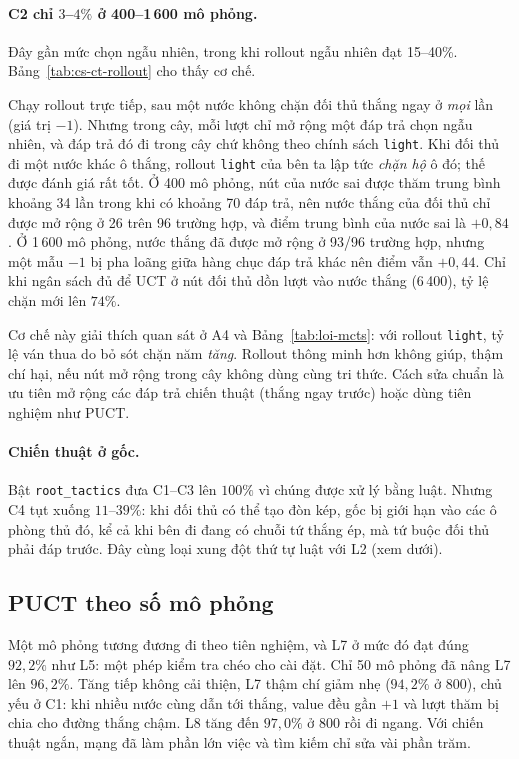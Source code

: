 \paragraph{C2 chỉ $3$--$4\%$ ở 400--1\,600 mô phỏng.} Đây gần mức chọn ngẫu nhiên, trong khi rollout ngẫu nhiên đạt
15--40\%. Bảng~\ref{tab:cs-ct-rollout} cho thấy cơ chế.

Chạy rollout trực tiếp, sau một nước không chặn đối thủ thắng ngay ở \emph{mọi} lần (giá trị $-1$). Nhưng trong cây,
mỗi lượt chỉ mở rộng một đáp trả chọn ngẫu nhiên, và đáp trả đó đi trong cây chứ không theo chính sách
\texttt{light}. Khi đối thủ đi một nước khác ô thắng, rollout \texttt{light} của bên ta lập tức \emph{chặn hộ} ô đó; thế
được đánh giá rất tốt. Ở 400 mô phỏng, nút của nước sai được thăm trung bình khoảng 34 lần trong khi có khoảng 70 đáp
trả, nên nước thắng của đối thủ chỉ được mở rộng ở 26 trên 96 trường hợp, và điểm trung bình của nước sai là $+0{,}84$.
Ở 1\,600 mô phỏng, nước thắng đã được mở rộng ở 93/96 trường hợp, nhưng một mẫu $-1$ bị pha loãng giữa hàng chục đáp
trả khác nên điểm vẫn $+0{,}44$. Chỉ khi ngân sách đủ để UCT ở nút đối thủ dồn lượt vào nước thắng (6\,400), tỷ lệ chặn
mới lên $74\%$.

Cơ chế này giải thích quan sát ở A4 và Bảng~\ref{tab:loi-mcts}: với rollout \texttt{light}, tỷ lệ ván thua do bỏ sót chặn
năm \emph{tăng}. Rollout thông minh hơn không giúp, thậm chí hại, nếu nút mở rộng trong cây không dùng cùng tri thức.
Cách sửa chuẩn là ưu tiên mở rộng các đáp trả chiến thuật (thắng ngay trước) hoặc dùng tiên nghiệm như PUCT.

\paragraph{Chiến thuật ở gốc.} Bật \texttt{root\_tactics} đưa C1--C3 lên $100\%$ vì chúng được xử lý bằng luật. Nhưng C4
tụt xuống $11$--$39\%$: khi đối thủ có thể tạo đòn kép, gốc bị giới hạn vào các ô phòng thủ đó, kể cả khi bên đi đang có
chuỗi tứ thắng ép, mà tứ buộc đối thủ phải đáp trước. Đây cùng loại xung đột thứ tự luật với L2 (xem dưới).

\subsection{PUCT theo số mô phỏng}

Một mô phỏng tương đương đi theo tiên nghiệm, và L7 ở mức đó đạt đúng $92{,}2\%$ như L5: một phép kiểm tra chéo cho cài
đặt. Chỉ 50 mô phỏng đã nâng L7 lên $96{,}2\%$. Tăng tiếp không cải thiện, L7 thậm chí giảm nhẹ ($94{,}2\%$ ở 800), chủ
yếu ở C1: khi nhiều nước cùng dẫn tới thắng, value đều gần $+1$ và lượt thăm bị chia cho đường thắng chậm. L8 tăng đến
$97{,}0\%$ ở 800 rồi đi ngang. Với chiến thuật ngắn, mạng đã làm phần lớn việc và tìm kiếm chỉ sửa vài phần trăm.

